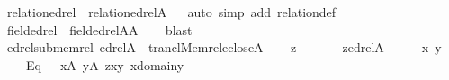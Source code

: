 \begin{isabellebody}
\endisatagproof
{\isafoldproof}%
%
\isadelimproof
\isanewline
%
\endisadelimproof
\isanewline
{}\isamarkupfalse%
\ relation{\isacharunderscore}{\kern0pt}edrel\ {\isacharcolon}{\kern0pt}\ {\isachardoublequoteopen}relation{\isacharparenleft}{\kern0pt}edrel{\isacharparenleft}{\kern0pt}A{\isacharparenright}{\kern0pt}{\isacharparenright}{\kern0pt}{\isachardoublequoteclose}\isanewline
%
\isadelimproof
\ \ %
\endisadelimproof
%
\isatagproof
{}\isamarkupfalse%
{\isacharparenleft}{\kern0pt}auto\ simp\ add{\isacharcolon}{\kern0pt}\ relation{\isacharunderscore}{\kern0pt}def{\isacharparenright}{\kern0pt}%
\endisatagproof
{\isafoldproof}%
%
\isadelimproof
\isanewline
%
\endisadelimproof
\isanewline
{}\isamarkupfalse%
\ field{\isacharunderscore}{\kern0pt}edrel\ {\isacharcolon}{\kern0pt}\ {\isachardoublequoteopen}field{\isacharparenleft}{\kern0pt}edrel{\isacharparenleft}{\kern0pt}A{\isacharparenright}{\kern0pt}{\isacharparenright}{\kern0pt}{\isasymsubseteq}A{\isachardoublequoteclose}\isanewline
%
\isadelimproof
\ \ %
\endisadelimproof
%
\isatagproof
{}\isamarkupfalse%
\ blast%
\endisatagproof
{\isafoldproof}%
%
\isadelimproof
\isanewline
%
\endisadelimproof
\isanewline
{}\isamarkupfalse%
\ edrel{\isacharunderscore}{\kern0pt}sub{\isacharunderscore}{\kern0pt}memrel{\isacharcolon}{\kern0pt}\ {\isachardoublequoteopen}edrel{\isacharparenleft}{\kern0pt}A{\isacharparenright}{\kern0pt}\ {\isasymsubseteq}\ trancl{\isacharparenleft}{\kern0pt}Memrel{\isacharparenleft}{\kern0pt}eclose{\isacharparenleft}{\kern0pt}A{\isacharparenright}{\kern0pt}{\isacharparenright}{\kern0pt}{\isacharparenright}{\kern0pt}{\isachardoublequoteclose}\isanewline
%
\isadelimproof
%
\endisadelimproof
%
\isatagproof
{}\isamarkupfalse%
\isanewline
\ \ \isamarkupfalse%
\ z\isanewline
\ \ \isamarkupfalse%
\isanewline
\ \ \ \ {\isachardoublequoteopen}z{\isasymin}edrel{\isacharparenleft}{\kern0pt}A{\isacharparenright}{\kern0pt}{\isachardoublequoteclose}\isanewline
\ \ \isamarkupfalse%
\ \isamarkupfalse%
\ x\ y\ \isanewline
\ \ \ \ Eq{}{\isacharcolon}{\kern0pt}\ \ \ {\isachardoublequoteopen}x{\isasymin}A{\isachardoublequoteclose}\ {\isachardoublequoteopen}y{\isasymin}A{\isachardoublequoteclose}\ {\isachardoublequoteopen}z{\isacharequal}{\kern0pt}{\isasymlangle}x{\isacharcomma}{\kern0pt}y{\isasymrangle}{\isachardoublequoteclose}\ {\isachardoublequoteopen}x{\isasymin}domain{\isacharparenleft}{\kern0pt}y{\isacharparenright}{\kern0pt}{\isachardoublequoteclose}\isanewline

\end{isabellebody}
